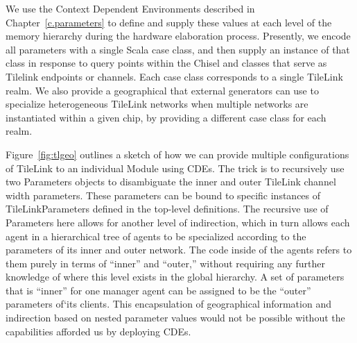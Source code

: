 We use the Context Dependent Environments described in Chapter~\ref{c.parameters} to define and supply these values
at each level of the memory hierarchy during the hardware elaboration process.
Presently, we encode all parameters with a single Scala case class, and then supply an instance of that class in
response to query points within the Chisel  and  classes that serve as Tilelink endpoints or channels.
Each case class corresponds to a single TileLink realm.
We also provide a geographical  that external generators can use to specialize heterogeneous TileLink
networks when multiple networks are instantiated within a given chip, by providing a different case class for each realm.

Figure~\ref{fig:tlgeo} outlines a sketch of how we can provide multiple configurations of TileLink to an individual Module using CDEs.
The trick is to recursively use two Parameters objects to disambiguate the inner and outer TileLink channel width parameters.
These parameters can be bound to specific instances of TileLinkParameters defined in the top-level definitions.
The recursive use of Parameters here allows for another level of indirection, which in turn allows each agent
in a hierarchical tree of agents to be specialized according to the parameters of its inner and outer network.
The code inside of the agents refers to them purely in terms of ``inner'' and ``outer,'' without
requiring any further knowledge of where this level exists in the global hierarchy.
A set of parameters that is ``inner'' for one manager agent can be assigned to be the ``outer'' parameters of`its clients.
This encapsulation of geographical information and indirection based on nested parameter values would not be possible without
the capabilities afforded us by deploying CDEs.

